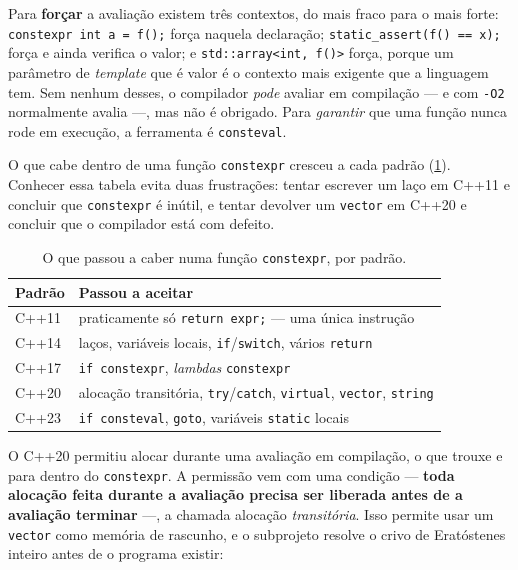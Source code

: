 Para \textbf{forçar} a avaliação existem três contextos, do mais fraco para o
mais forte: \texttt{constexpr int a = f();} força naquela declaração;
\texttt{static\_assert(f() == x);} força e ainda verifica o valor; e
\texttt{std::array<int, f()>} força, porque um parâmetro de \emph{template} que
é valor é o contexto mais exigente que a linguagem tem. Sem nenhum desses, o
compilador \emph{pode} avaliar em compilação --- e com \texttt{-O2} normalmente
avalia ---, mas não é obrigado. Para \emph{garantir} que uma função nunca rode
em execução, a ferramenta é \texttt{consteval}.

O que cabe dentro de uma função \texttt{constexpr} cresceu a cada padrão
(\cref{tab:evolucao-constexpr}). Conhecer essa tabela evita duas frustrações:
tentar escrever um laço em C++11 e concluir que \texttt{constexpr} é inútil, e
tentar devolver um \texttt{vector} em C++20 e concluir que o compilador está com
defeito.

\begin{table}[htbp]
\centering
\caption{O que passou a caber numa função \texttt{constexpr}, por padrão.}
\label{tab:evolucao-constexpr}
\footnotesize
\begin{tabular}{@{}ll@{}}
\toprule
\textbf{Padrão} & \textbf{Passou a aceitar} \\
\midrule
C++11 & praticamente só \texttt{return expr;} --- uma única instrução \\
C++14 & laços, variáveis locais, \texttt{if}/\texttt{switch}, vários \texttt{return} \\
C++17 & \texttt{if constexpr}, \emph{lambdas} \texttt{constexpr} \\
C++20 & alocação transitória, \texttt{try}/\texttt{catch}, \texttt{virtual}, \texttt{vector}, \texttt{string} \\
C++23 & \texttt{if consteval}, \texttt{goto}, variáveis \texttt{static} locais \\
\bottomrule
\end{tabular}
\end{table}

O C++20 permitiu alocar durante uma avaliação em compilação, o que trouxe
 e  para dentro do \texttt{constexpr}. A
permissão vem com uma condição --- \textbf{toda alocação feita durante a
avaliação precisa ser liberada antes de a avaliação terminar} ---, a chamada
alocação \emph{transitória}. Isso permite usar um \texttt{vector} como memória
de rascunho, e o subprojeto resolve o crivo de Eratóstenes inteiro antes de o
programa existir:

